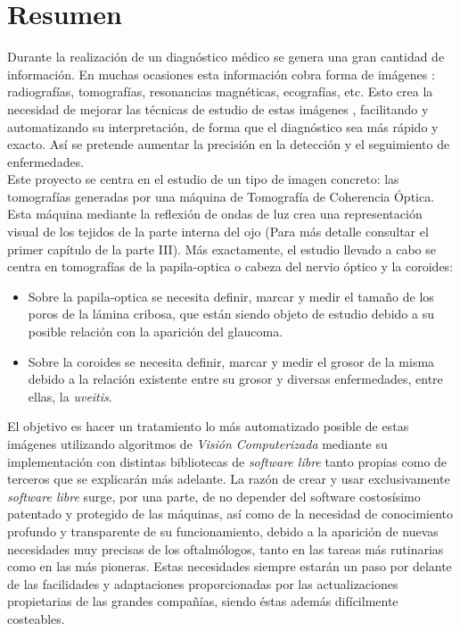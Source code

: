 \section*{Resumen}
Durante la realización de un diagnóstico médico se genera una gran
cantidad de información. En muchas ocasiones esta información cobra
forma de imágenes \emph{\citep*[1. The Analysis of Medical Images,
  2. Digital Image Acquisition]{toennies2012guide}}: radiografías,
tomografías, resonancias magnéticas, ecografías, etc. Esto crea la
necesidad de mejorar las técnicas de estudio de estas imágenes
\emph{\citep*[4. Image Enhancement]{toennies2012guide}}, facilitando y
automatizando su interpretación, de forma que el diagnóstico sea más
rápido y exacto. Así se pretende aumentar la precisión en la detección
y el seguimiento de enfermedades.\\
Este proyecto se centra en el estudio de un tipo de imagen concreto:
las tomografías generadas por una máquina de Tomografía de Coherencia
Óptica. Esta máquina mediante la reflexión de ondas de luz crea una
representación visual de los tejidos de la parte interna del ojo (Para
más detalle consultar el primer capítulo de la parte III). Más
exactamente, el estudio llevado a cabo se centra en tomografías de la
\gls{papila-optica} o cabeza del nervio óptico y la \gls{coroides}:
\begin{itemize}
\item Sobre la \gls{papila-optica} se necesita definir, marcar y medir
  el tamaño de los poros de la lámina cribosa, que están siendo objeto
  de estudio debido a su posible relación con la aparición del
  \gls{glaucoma}.
\item Sobre la \gls{coroides} se necesita definir, marcar y medir el
  grosor de la misma debido a la relación existente entre su grosor y
  diversas enfermedades, entre ellas, la \emph{\gls{uveitis}}.
\end{itemize}
El objetivo es hacer un tratamiento lo más automatizado posible de estas imágenes utilizando algoritmos de \emph{Visión Computerizada}
mediante su implementación con distintas bibliotecas de \emph{software
  libre} tanto propias como de terceros que se explicarán más
adelante. La razón de crear y usar exclusivamente \emph{software
  libre} surge, por una parte, de no depender del software costosísimo
patentado y protegido de las máquinas, así como de la necesidad de
conocimiento profundo y transparente de su funcionamiento, debido a la
aparición de nuevas necesidades muy precisas de los oftalmólogos,
tanto en las tareas más rutinarias como en las más pioneras. Estas
necesidades siempre estarán un paso por delante de las facilidades y
adaptaciones proporcionadas por las actualizaciones propietarias de
las grandes compañías, siendo éstas además difícilmente costeables.

